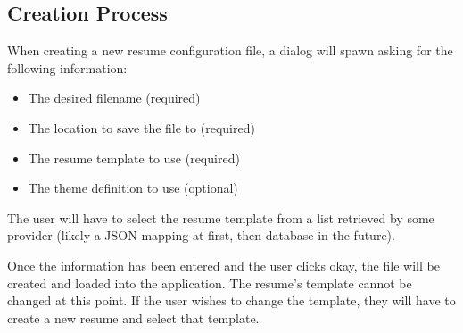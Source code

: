 \documentclass[12pt]{article}
\begin{document}
    \subsection{Creation Process}
    When creating a new resume configuration file, a dialog will spawn asking for the following information:
    \begin{itemize}
        \item The desired filename (required)
        \item The location to save the file to (required)
        \item The resume template to use (required)
        \item The theme definition to use (optional)
    \end{itemize}

    The user will have to select the resume template from a list retrieved by some provider (likely a JSON 
    mapping at first, then database in the future). 

    Once the information has been entered and the user clicks okay, the file will be created and loaded 
    into the application. The resume's template cannot be changed at this point. If the user wishes to 
    change the template, they will have to create a new resume and select that template.
\end{document}
